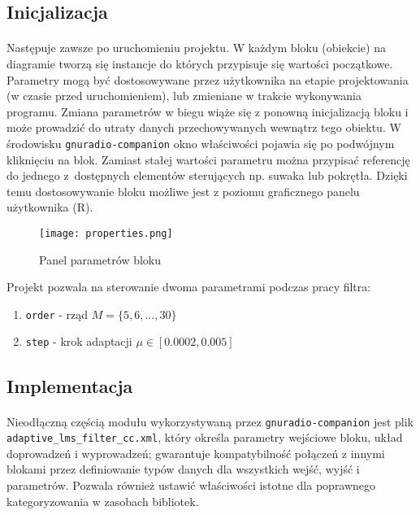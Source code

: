 \subsection{Inicjalizacja}
\paragraph{}
Następuje zawsze po uruchomieniu projektu. 
W każdym bloku (obiekcie) na diagramie tworzą się instancje do których przypisuje się wartości początkowe.
Parametry mogą być dostosowywane przez użytkownika na etapie projektowania (w czasie przed uruchomieniem), lub zmieniane w trakcie wykonywania programu.
Zmiana parametrów w biegu wiąże się z ponowną inicjalizacją bloku i może prowadzić do utraty danych przechowywanych wewnątrz tego obiektu. 
W środowisku \texttt{gnuradio-companion} okno właściwości pojawia się po podwójnym kliknięciu na blok. 
Zamiast stałej wartości parametru można przypisać referencję do jednego z~dostępnych elementów sterujących np. suwaka lub pokrętła. 
Dzięki temu dostosowywanie bloku możliwe jest z poziomu graficznego panelu użytkownika (R).

\begin{figure}[t]
\centering
\texttt{[image: properties.png]}
\caption{Panel parametrów bloku}
\label{blockproperties}
\end{figure}

Projekt pozwala na sterowanie dwoma parametrami podczas pracy filtra:
\begin{enumerate}
\item \texttt{order} - rząd $M = \{5,6,...,30\}$
\item \texttt{step} - krok adaptacji $\mu \in [0.0002, 0.005]$
\end{enumerate}

\subsection{Implementacja}
\paragraph{}
Nieodłączną częścią modułu wykorzystywaną przez \texttt{gnuradio-companion} jest plik \texttt{adaptive\_lms\_filter\_cc.xml}, który określa parametry wejściowe bloku, układ doprowadzeń i wyprowadzeń; gwarantuje kompatybilność połączeń z innymi blokami przez definiowanie typów danych dla wszystkich wejść, wyjść i parametrów. 
Pozwala również ustawić właściwości istotne dla poprawnego kategoryzowania w zasobach bibliotek.

